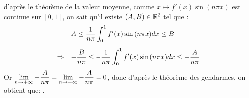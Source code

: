 \documentclass[a4paper, 11pt,reqno]{article}
\begin{document}
\begin{correction}
\begin{itemize}
		      d'apr\`es le th\'eor\`eme de la valeur moyenne, comme $x \mapsto f'(x) \sin(n\pi x)$ est continue sur $[0,1]$, on sait qu'il existe $(A,B)\in \mathbb{R}^2$ tel que :
		      $$\begin{array}{cl}
				                  & A \leq \ddp\frac{1}{n\pi } \int_0^1 f^{\prime}(x)\sin{(n\pi x)}dx \leq B\vsec                                    \\
				      \Rightarrow & -\ddp\frac{B}{n\pi } \leq - \ddp\frac{1}{n\pi } \int_0^1 f^{\prime}(x)\sin{(n\pi x)}dx \leq -\ddp\frac{A}{n\pi }
			      \end{array}$$
		      Or $\displaystyle \lim\limits_{n \to +\infty} -\displaystyle\frac{A}{n\pi } =  \lim\limits_{n \to +\infty} -\displaystyle\frac{A}{n\pi } = 0$, donc d'apr\`{e}s le th\'eor\`{e}me des gendarmes, on obtient que: .
	\end{itemize}
\end{correction}


\vspace{1cm}
\end{document}
